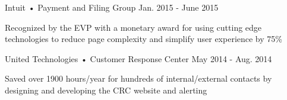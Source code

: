 \begin{cventries}
  \cventry
    {Intuit • Payment and Filing Group} %
    {} %
    {} %
    {Jan. 2015 - June 2015} %
    {
      \begin{cvitems} %
        \item {Recognized by the EVP with a monetary award for using cutting edge technologies to reduce page complexity and simplify user experience by 75\%}
      \end{cvitems}
    }

  \cventry
    {United Technologies • Customer Response Center} %
    {} %
    {} %
    {May 2014 - Aug. 2014} %
    {
      \begin{cvitems} %
        \item {Saved over 1900 hours/year for hundreds of internal/external contacts by designing and developing the CRC website and alerting}
      \end{cvitems}
    }


\end{cventries}
